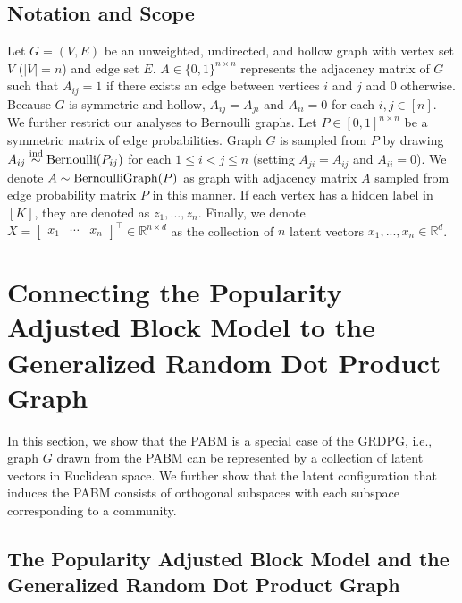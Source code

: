 \documentclass[12pt]{article}
\begin{document}
\hypertarget{notation}{%
\subsection{Notation and Scope}\label{notation}}

Let $G = (V, E)$ be an unweighted, undirected, and hollow graph with vertex set $V$ ($|V| = n$) and edge set $E$. $A \in \{0, 1\}^{n \times n}$ represents the adjacency matrix of $G$ such that $A_{ij} = 1$ if there exists an edge between vertices $i$ and $j$ and $0$ otherwise. Because $G$ is symmetric and hollow,
$A_{ij} = A_{ji}$ and $A_{ii} = 0$ for each $i, j \in [n]$. We further restrict our analyses to Bernoulli graphs. Let $P \in [0, 1]^{n \times n}$ be a symmetric matrix of edge probabilities. Graph $G$ is sampled from $P$ by drawing $A_{ij} \stackrel{\mathrm{ind}}{\sim} \mathrm{Bernoulli}(P_{ij})$ for each $1 \leq i < j \leq n$  (setting $A_{ji} = A_{ij}$ and $A_{ii} = 0$). We denote $A \sim \mathrm{BernoulliGraph}(P)$ as graph with adjacency matrix $A$ sampled from edge probability matrix $P$ in this manner. If each vertex has a hidden label in $[K]$, they are denoted as $z_1, ..., z_n$. Finally, we denote $X = \begin{bmatrix} x_1 & \cdots & x_n \end{bmatrix}^\top \in \mathbb{R}^{n \times d}$ as the collection of $n$ latent vectors $x_1, ..., x_n \in \mathbb{R}^d$.

\hypertarget{connecting-the-popularity-adjusted-block-model-to-the-generalized-random-dot-product-graph}{%
\section{Connecting the Popularity Adjusted Block Model to the
Generalized Random Dot Product
Graph}\label{connecting-the-popularity-adjusted-block-model-to-the-generalized-random-dot-product-graph}}

In this section, we show that the PABM is a special case of the GRDPG, i.e.,
graph $G$ drawn from the PABM can be represented by a collection of latent
vectors in Euclidean space. We further show that the latent configuration that
induces the PABM consists of orthogonal subspaces with each subspace
corresponding to a community.

\hypertarget{the-popularity-adjusted-block-model-and-the-generalized-random-dot-product-graph}{%
\subsection{The Popularity Adjusted Block Model and the Generalized
Random Dot Product
Graph}\label{the-popularity-adjusted-block-model-and-the-generalized-random-dot-product-graph}}
\end{document}
